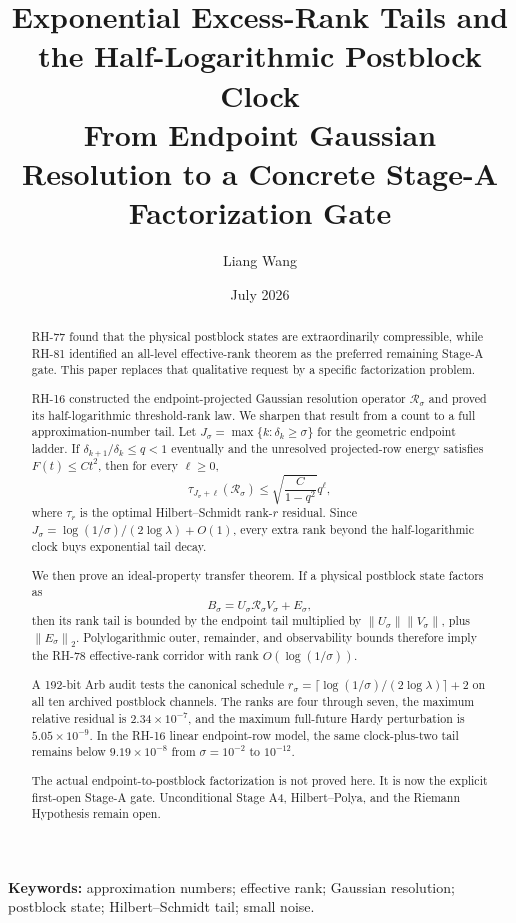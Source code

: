 \documentclass[11pt]{article}
\title{Exponential Excess-Rank Tails and the Half-Logarithmic Postblock Clock\\
\large From Endpoint Gaussian Resolution to a Concrete Stage-A Factorization Gate}
\author{Liang Wang}
\date{July 2026}
\theoremstyle{remark}
\newcommand{\norm}[1]{\left\lVert#1\right\rVert}
\newcommand{\cR}{\mathcal R}
\begin{document}
\maketitle

\begin{abstract}
RH-77 found that the physical postblock states are extraordinarily
compressible, while RH-81 identified an all-level effective-rank theorem as
the preferred remaining Stage-A gate.  This paper replaces that qualitative
request by a specific factorization problem.

RH-16 constructed the endpoint-projected Gaussian resolution operator
$\cR_\sigma$ and proved its half-logarithmic threshold-rank law.  We sharpen
that result from a count to a full approximation-number tail.  Let
$J_\sigma=\max\{k:\delta_k\ge\sigma\}$ for the geometric endpoint ladder.
If $\delta_{k+1}/\delta_k\le q<1$ eventually and the unresolved projected-row
energy satisfies $F(t)\le Ct^2$, then for every $\ell\ge0$,
\[
 \tau_{J_\sigma+\ell}(\cR_\sigma)
 \le \sqrt{\frac{C}{1-q^2}}q^\ell,
\]
where $\tau_r$ is the optimal Hilbert--Schmidt rank-$r$ residual.  Since
$J_\sigma=\log(1/\sigma)/(2\log\lambda)+O(1)$, every extra rank beyond the
half-logarithmic clock buys exponential tail decay.

We then prove an ideal-property transfer theorem.  If a physical postblock
state factors as
\[
 B_\sigma=U_\sigma\cR_\sigma V_\sigma+E_\sigma,
\]
then its rank tail is bounded by the endpoint tail multiplied by
$\norm{U_\sigma}\norm{V_\sigma}$, plus $\norm{E_\sigma}_2$.  Polylogarithmic
outer, remainder, and observability bounds therefore imply the RH-78
effective-rank corridor with rank $O(\log(1/\sigma))$.

A 192-bit Arb audit tests the canonical schedule
$r_\sigma=\lceil\log(1/\sigma)/(2\log\lambda)\rceil+2$ on all ten archived
postblock channels.  The ranks are four through seven, the maximum relative
residual is $2.34\times10^{-7}$, and the maximum full-future Hardy
perturbation is $5.05\times10^{-9}$.  In the RH-16 linear endpoint-row model,
the same clock-plus-two tail remains below $9.19\times10^{-8}$ from
$\sigma=10^{-2}$ to $10^{-12}$.

The actual endpoint-to-postblock factorization is not proved here.  It is now
the explicit first-open Stage-A gate.  Unconditional Stage A4,
Hilbert--Polya, and the Riemann Hypothesis remain open.
\end{abstract}

\noindent\textbf{Keywords:} approximation numbers; effective rank; Gaussian
resolution; postblock state; Hilbert--Schmidt tail; small noise.
\end{document}
